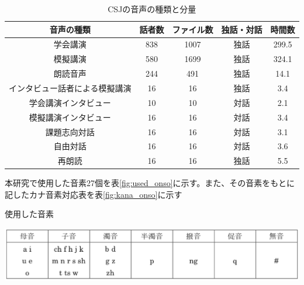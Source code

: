 \begin{table}[htb]
  \begin{center}
    \caption{CSJの音声の種類と分量 \label{table:detail_csj}}
    \begin{tabular}{|c||c|c|c|c|} \hline
      音声の種類 & 話者数 & ファイル数 & 独話・対話 & 時間数\\ \hline
      学会講演 & 838 & 1007 & 独話 & 299.5 \\ \hline
      模擬講演 & 580 & 1699 & 独話 & 324.1 \\ \hline
      朗読音声 & 244 & 491 & 独話 & 14.1 \\ \hline
      インタビュー話者による模擬講演 & 16 & 16 & 独話 & 3.4 \\ \hline
      学会講演インタビュー & 10 & 10 & 対話 & 2.1 \\ \hline
      模擬講演インタビュー & 16 & 16 & 対話 & 3.4 \\ \hline
      課題志向対話 & 16 & 16 & 対話 & 3.1 \\ \hline
      自由対話 & 16 & 16 & 対話 & 3.6 \\ \hline
      再朗読 & 16 & 16 & 独話 & 5.5\\ \hline
    \end{tabular}
  \end{center}
\end{table}


\vspace{0.2in}\par
本研究で使用した音素27個を表\ref{fig:used_onso}に示す。また、その音素をもとに記したカナ音素対応表を表\ref{fig:kana_onso}に示す

\begin{table}[H]
  \begin{center}
    \caption{使用した音素 \label{fig:used_onso}}
    \includegraphics[scale=0.7]{./figure/used_onso.eps}
  \end{center}
  
\end{table}

